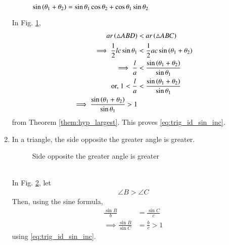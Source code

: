 \begin{enumerate}[label=\arabic*.,ref=\thesubsection.\theenumi]
\begin{figure}[!ht]
	\begin{center}
		
		\resizebox{\columnwidth}{!}{}
	\end{center}
	\caption{$\sin \left(\theta_1+\theta_2\right) = \sin\theta_1\cos\theta_2 + \cos\theta_1\sin\theta_2$}
	\label{fig:tri_sin_inc}	
\end{figure}
\solution In Fig. \ref{fig:tri_sin_inc}, 	
%
\begin{align}
ar\left(\triangle ABD\right) &< ar \left(\triangle ABC\right)
\\
\implies \frac{1}{2}lc \sin \theta_1 &<  \frac{1}{2}ac \sin \left(\theta_1 + \theta_2 \right)
\\
\implies \frac{l}{a} &< \frac{\sin \left(\theta_1 + \theta_2 \right)}{\sin \theta_1}
\\
\text{or, } 1 < \frac{l}{a} &< \frac{\sin \left(\theta_1 + \theta_2 \right)}{\sin \theta_1}
\\
\implies \frac{\sin \left(\theta_1 + \theta_2 \right)}{\sin \theta_1} > 1
\end{align}
%
from Theorem \ref{them:hyp_largest}. This proves \eqref{eq:trig_id_sin_inc}.
%
\item In a triangle, the side opposite the greater angle is greater.
\begin{figure}[!ht]
	\begin{center}
			\resizebox{\columnwidth}{!}{}
	\end{center}
	\caption{Side opposite the greater angle is greater}
	\label{fig:tri_ang_side}	
\end{figure}
\\
\solution In Fig. 	\ref{fig:tri_ang_side},	let
%
\begin{align}
\angle B > \angle C
\end{align}
%
Then, using the sine formula,
%
\begin{align}
\frac{\sin B}{b} &=\frac{\sin C}{c}
\\
\implies   \frac{\sin B}{\sin C} &= \frac{b}{c} > 1
\end{align}
using \eqref{eq:trig_id_sin_inc}.


\end{enumerate}
